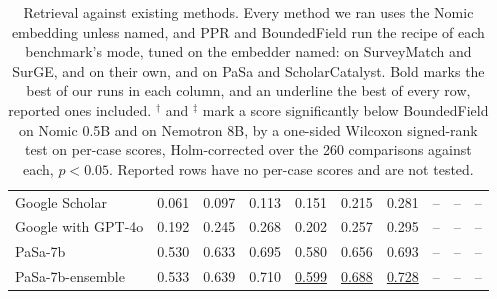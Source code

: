 \begin{table}[t]
\begin{subtable}{\textwidth}
\begin{tabular}{lrrrrrrrrr}
Google Scholar & 0.061 & 0.097 & 0.113 & 0.151 & 0.215 & 0.281 & -- & -- & -- \\
Google with GPT-4o & 0.192 & 0.245 & 0.268 & 0.202 & 0.257 & 0.295 & -- & -- & -- \\
PaSa-7b & 0.530 & 0.633 & 0.695 & 0.580 & 0.656 & 0.693 & -- & -- & -- \\
PaSa-7b-ensemble & 0.533 & 0.639 & 0.710 & \underline{0.599} & \underline{0.688} & \underline{0.728} & -- & -- & -- \\
\bottomrule
\end{tabular}
\end{subtable}
\caption{Retrieval against existing methods. Every method we ran uses the Nomic embedding unless named, and PPR and BoundedField run the recipe of each benchmark's mode, tuned on the embedder named:  on SurveyMatch and SurGE,  and  on their own, and  on PaSa and ScholarCatalyst. Bold marks the best of our runs in each column, and an underline the best of every row, reported ones included. $^\dagger$ and $^\ddagger$ mark a score significantly below BoundedField on Nomic 0.5B and on Nemotron 8B, by a one-sided Wilcoxon signed-rank test on per-case scores, Holm-corrected over the 260 comparisons against each, $p < 0.05$. Reported rows have no per-case scores and are not tested.}
\label{tab:retrieval}
\end{table}

